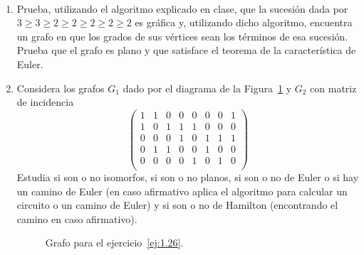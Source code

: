 \begin{ejercicio}\label{ej:1.26}~
    \begin{enumerate}
        \item Prueba, utilizando el algoritmo explicado en clase, que la sucesión dada por $3 \geq 3 \geq 2 \geq 2 \geq 2 \geq 2 \geq 2$ es gráfica y, utilizando dicho algoritmo, encuentra un grafo en que los grados de sus vértices sean los términos de esa sucesión. Prueba que el grafo es plano y que satisface el teorema de la característica de Euler.
        
        \item Considera los grafos $G_1$ dado por el diagrama de la Figura~\ref{fig:1.26_1} y $G_2$ con matriz de incidencia
        \[
            \begin{pmatrix}
                1 & 1 & 0 & 0 & 0 & 0 & 0 & 1 \\
                1 & 0 & 1 & 1 & 1 & 0 & 0 & 0 \\
                0 & 0 & 0 & 1 & 0 & 1 & 1 & 1 \\
                0 & 1 & 1 & 0 & 0 & 1 & 0 & 0 \\
                0 & 0 & 0 & 0 & 1 & 0 & 1 & 0 \\
            \end{pmatrix}
        \]
        Estudia si son o no isomorfos, si son o no planos, si son o no de Euler o si hay un camino de Euler (en caso afirmativo aplica el algoritmo para calcular un circuito o un camino de Euler) y si son o no de Hamilton (encontrando el camino en caso afirmativo).
        \begin{figure}
            \centering
            \caption{Grafo para el ejercicio~\ref{ej:1.26}.}
            \label{fig:1.26_1}
        \end{figure}
    \end{enumerate}
\end{ejercicio}


